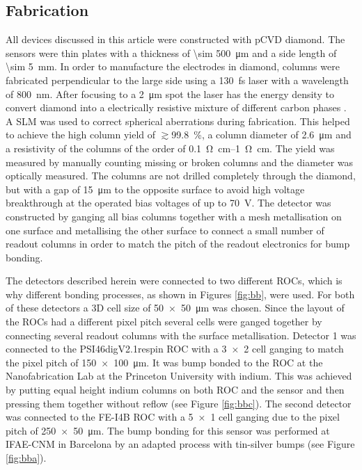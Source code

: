 \subsection{Fabrication}
All devices discussed in this article were constructed with \ac{pCVD} diamond. The sensors were thin plates with a thickness of \SI{\sim 500}{\um} and a side length of \SI{\sim 5}{\mm}. In order to manufacture the electrodes in diamond, columns were fabricated perpendicular to the large side using a \SI{130}{\femto\second} laser with a wavelength of \SI{800}{\nano\meter}. After focusing to a \SI{2}{\um} spot the laser has the energy density to convert diamond into a electrically resistive mixture of different carbon phases \cite{3dfab}. A \ac{SLM} \cite{slm} was used to correct spherical aberrations during fabrication. This helped to achieve the high column yield of $\gtrsim$\SI{ 99.8}{\%}, a column diameter of \SI{2.6}{\micro\meter} and a resistivity of the columns of the order of \SIrange{.1}{1}{\ohm\cm}. The yield was measured by manually counting missing or broken columns and the diameter was optically measured. The columns are not drilled completely through the diamond, but with a gap of \SI{15}{\micro\meter} to the opposite surface to avoid high voltage breakthrough at the operated bias voltages of up to \SI{70}{\volt}. The detector was constructed by ganging all bias columns together with a mesh metallisation on one surface and metallising the other surface to connect a small number of readout columns in order to match the pitch of the readout electronics for bump bonding.\par
The detectors described herein were connected to two different \acp{ROC}, which is why different bonding processes, as shown in Figures \ref{fig:bb}, were used. For both of these detectors a 3D cell size of \SI{50x50}{\micro\meter} was chosen. Since the layout of the \acp{ROC} had a different pixel pitch several cells were ganged together by connecting several readout columns with the surface metallisation. Detector 1 was connected to the PSI46digV2.1respin \ac{ROC} \cite{kornmayer} with a \SI{3x2}{} cell ganging to match the pixel pitch of \SI{150x100}{\micro\meter}. It was bump bonded to the \ac{ROC} at the Nanofabrication Lab at the Princeton University \cite{nanolab} with indium. This was achieved by putting equal height indium columns on both \ac{ROC} and the sensor and then pressing them together without reflow (see Figure \ref{fig:bbc}). The second detector was connected to the FE-I4B \ac{ROC} \cite{fei4} with a \SI{5x1}{} cell ganging due to the pixel pitch of \SI{250x50}{\micro\meter}. The bump bonding for this sensor was performed at IFAE-CNM in Barcelona \cite{ifae, cnm} by an adapted process with tin-silver bumps (see Figure \ref{fig:bba}).\par
